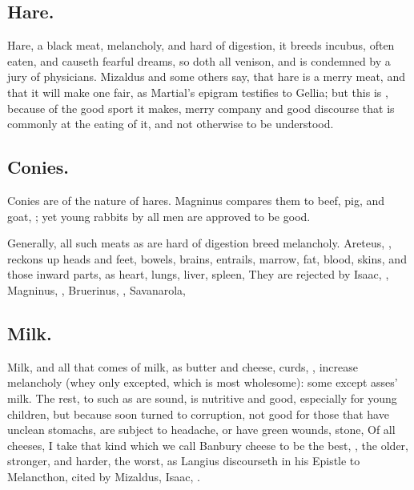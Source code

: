 \subsection{Hare.}
Hare, a black meat, melancholy, and hard of digestion, it breeds incubus, often
eaten, and causeth fearful dreams, so doth all venison, and is condemned by a
jury of physicians. Mizaldus and some others say, that hare is a merry meat,
and that it will make one fair, as Martial's epigram testifies to Gellia; but
this is , because of the good sport it makes, merry company
and good discourse that is commonly at the eating of it, and not otherwise to
be understood.

\subsection{Conies.}
Conies are of the nature of hares. Magninus compares them
to beef, pig, and goat, ; yet
young rabbits by all men are approved to be good.

Generally, all such meats as are hard of digestion breed melancholy. Areteus,
, reckons up heads and feet,
bowels, brains, entrails, marrow, fat, blood, skins, and
those inward parts, as heart, lungs, liver, spleen, \etc{} They are rejected by
Isaac, , Magninus,
, Bruerinus, , Savanarola, 

\subsection{Milk.}
Milk, and all that comes of milk, as butter and cheese, curds, \etc{}, increase
melancholy (whey only excepted, which is most wholesome):
some except asses' milk. The rest, to such as are sound,
is nutritive and good, especially for young children, but because soon turned
to corruption, not good for those that have unclean
stomachs, are subject to headache, or have green wounds, stone, \etc{} Of all
cheeses, I take that kind which we call Banbury cheese to be the best, , the older, stronger, and harder, the worst, as Langius
discourseth in his Epistle to Melancthon, cited by Mizaldus, Isaac,
. \etc{}

